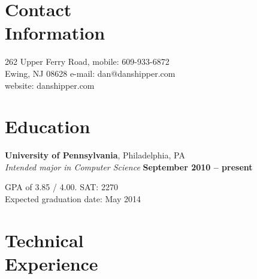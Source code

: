 \documentclass[margin,line]{resume}
\begin{document}
\begin{resume}

    \section{\mysidestyle Contact\\Information}

    262 Upper Ferry Road,          \hfill mobile: 609-933-6872          \vspace{0mm}\\\vspace{0mm}%
    Ewing, NJ 08628                    \hfill e-mail: dan@danshipper.com  \vspace{0mm}\\\vspace{-4.5mm}%
					     \hfill website: danshipper.com  \vspace{0mm}\\\vspace{-2.5mm}%
     

    \section{\mysidestyle Education}

    \textbf{University of Pennsylvania}, Philadelphia, PA \vspace{2mm}\\\vspace{1mm}%
    \textsl{Intended major in Computer Science} \hfill \textbf{ September 2010 -- present}\vspace{-5mm}%
        
        GPA of 3.85 / 4.00. SAT: 2270\\
        Expected graduation date: May 2014

    \section{\mysidestyle Technical\\Experience}
    

\end{resume}
\end{document}
